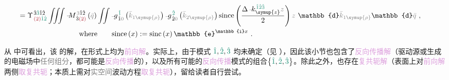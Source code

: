 \begin{subequations}
\begin{align}
	\hspace{-1.25em} &\hspace{-0.5em}= \Upsilon^{\;\! \hat{3} \textcolor{PineGreen}{\hat{3}} \hat{1} \hat{2} }_{\;\! \textcolor{Maroon}{(2)} \textcolor{PineGreen}{\hat{1} \hat{2}} } \iiint \xint{\mathcolor{gray}{-}}{18}{M}^{\;\! \mathcolor{gray}{3} \hat{1} \hat{2} }_{\;\! \hat{3} \textcolor{Maroon}{(2)} } \left( \mathcolor{gray}{\bar{q}} \right) \iint \xint{{}^{}_{\mathcolor{gray}{-}}}{10}{g}^{\;\! \textcolor{PineGreen}{\hat{1}}}_{\;\! \hat{1} \mathcolor{gray}{0}} \left( \mathcolor{gray}{\bar{k}_{1\symup{\rho}}} \right) \xint{{}^{}_{\mathcolor{gray}{-}}}{10}{g}^{\;\! \textcolor{PineGreen}{\hat{2}}}_{\;\! \hat{2} \mathcolor{gray}{0}} \left( \mathcolor{gray}{\bar{k}_{2\symup{\rho}}} \right) \text{since} \left( \frac{ \Delta \xint{\begin{smallmatrix} ~ \\ {}^{}_{\mathcolor{gray}{-}} \\ ~ \end{smallmatrix}}{15}{k}_{\symup{z}}^{\;\! \textcolor{PineGreen}{\hat{1} \hat{2} \hat{3}} } \mathcolor{gray}{z} }{ 2 } \right) \mathcolor{gray}{z} ~ \mathbb{d} \mathcolor{gray}{\bar{k}_{1\symup{\rho}}} \mathbb{d} \mathcolor{gray}{\bar{q}} ~, \label{eq:up-scalar-g-EE-312-discrete-since2} \\
	\hspace{-1.25em} &\hspace{8em} \text{where} ~~~~~~ \text{since} \left( x \right) := \text{sinc} \left( x \right) \mathbb{e}^{\mathbb{i} x } ~. \label{eq:up-scalar-g-EE-312-discrete-since3}
\end{align}
\end{subequations}

从  中可看出，该  的解，在形式上均为\textcolor{Plum}{前向解}。实际上，由于\textcolor{PineGreen}{模式} $\textcolor{PineGreen}{\hat{1}}, \textcolor{PineGreen}{\hat{2}},\textcolor{PineGreen}{\hat{3}}$ 均未确定（见 ），因此该小节也包含了\textcolor{Plum}{反向传播解}（\textcolor{NavyBlue}{驱动源}或生成的电磁场中\textcolor{gray}{任何组分}，都可能是\textcolor{Plum}{反向传播}的），以及所有可能的\textcolor{Plum}{反向传播}\textcolor{PineGreen}{模式}的组合$\left\{ \textcolor{PineGreen}{\hat{1}}, \textcolor{PineGreen}{\hat{2}},\textcolor{PineGreen}{\hat{3}} \right\}$。除此之外，也存在\textcolor{Plum}{复共轭解}（表面上对\textcolor{Plum}{前向解}两侧\textcolor{Plum}{取复共轭}；本质上需对\textcolor{gray}{实空间}波动方程\textcolor{Plum}{取复共轭}），留给读者自行尝试。

